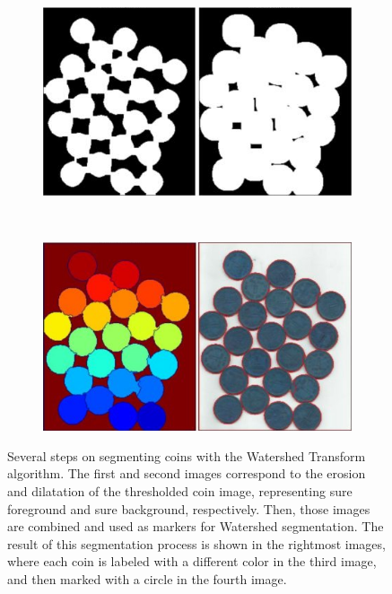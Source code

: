 
\begin{figure}[htbp]
	\centering
    \begin{subfigure}[l]{0.49\textwidth}
	    \centering
    	\includegraphics[width=\textwidth]
    	{figures/Watershed-example-02.png}
	\end{subfigure}
	~
    \begin{subfigure}[r]{0.49\textwidth}
	    \centering
    	\includegraphics[width=\textwidth]
    	{figures/Watershed-example-03.png}
	\end{subfigure} 
    \caption[Several steps on segmenting coins with the Watershed Transform algorithm.]
    {Several steps on segmenting coins with the Watershed Transform algorithm\footnotemark. The first and second images correspond to the erosion and dilatation of the thresholded coin image, representing sure foreground and sure background, respectively. Then, those images are combined and used as markers for Watershed segmentation. The result of this segmentation process is shown in the rightmost images, where each coin is labeled with a different color in the third image, and then marked with a circle in the fourth image. }
    \label{fig:watershed_example}
\end{figure}

